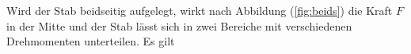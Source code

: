 \noindent
Wird der Stab beidseitig aufgelegt, wirkt nach Abbildung (\ref{fig:beids}) die Kraft $F$ in der Mitte 
und der Stab lässt sich in zwei Bereiche mit verschiedenen Drehmomenten unterteilen.
Es gilt












